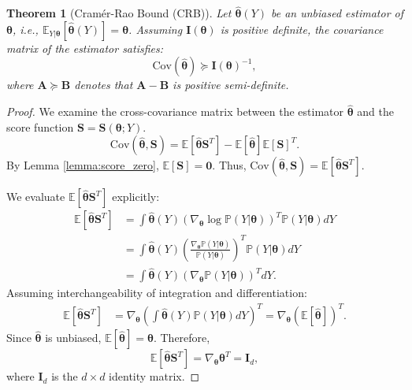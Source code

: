 \documentclass{article}
\newtheorem{theorem}{Theorem}[section]
\theoremstyle{definition}
\begin{document}
\begin{theorem}[Cramér-Rao Bound (CRB)]
\label{thm:crb}
Let $\hat{\boldsymbol{\theta}}(Y)$ be an unbiased estimator of $\boldsymbol{\theta}$, i.e., $\mathbb{E}_{Y|\boldsymbol{\theta}}[\hat{\boldsymbol{\theta}}(Y)] = \boldsymbol{\theta}$. Assuming $\mathbf{I}(\boldsymbol{\theta})$ is positive definite, the covariance matrix of the estimator satisfies:
\begin{equation}
    \text{Cov}(\hat{\boldsymbol{\theta}}) \succeq \mathbf{I}(\boldsymbol{\theta})^{-1},
\end{equation}
where $\mathbf{A} \succeq \mathbf{B}$ denotes that $\mathbf{A}-\mathbf{B}$ is positive semi-definite.
\end{theorem}
\begin{proof}
We examine the cross-covariance matrix between the estimator $\hat{\boldsymbol{\theta}}$ and the score function $\mathbf{S} = \mathbf{S}(\boldsymbol{\theta}; Y)$.
\begin{equation}
    \text{Cov}(\hat{\boldsymbol{\theta}}, \mathbf{S}) = \mathbb{E}[\hat{\boldsymbol{\theta}} \mathbf{S}^T] - \mathbb{E}[\hat{\boldsymbol{\theta}}] \mathbb{E}[\mathbf{S}]^T.
\end{equation}
By Lemma \ref{lemma:score_zero}, $\mathbb{E}[\mathbf{S}] = \mathbf{0}$. Thus, $\text{Cov}(\hat{\boldsymbol{\theta}}, \mathbf{S}) = \mathbb{E}[\hat{\boldsymbol{\theta}} \mathbf{S}^T]$.

We evaluate $\mathbb{E}[\hat{\boldsymbol{\theta}} \mathbf{S}^T]$ explicitly:
\begin{align}
    \mathbb{E}[\hat{\boldsymbol{\theta}} \mathbf{S}^T] &= \int \hat{\boldsymbol{\theta}}(Y) (\nabla_{\boldsymbol{\theta}} \log \mathbb{P}(Y|\boldsymbol{\theta}))^T \mathbb{P}(Y|\boldsymbol{\theta}) dY \\
    &= \int \hat{\boldsymbol{\theta}}(Y) \left(\frac{\nabla_{\boldsymbol{\theta}} \mathbb{P}(Y|\boldsymbol{\theta})}{\mathbb{P}(Y|\boldsymbol{\theta})}\right)^T \mathbb{P}(Y|\boldsymbol{\theta}) dY \\
    &= \int \hat{\boldsymbol{\theta}}(Y) (\nabla_{\boldsymbol{\theta}} \mathbb{P}(Y|\boldsymbol{\theta}))^T dY.
\end{align}
Assuming interchangeability of integration and differentiation:
\begin{align}
    \mathbb{E}[\hat{\boldsymbol{\theta}} \mathbf{S}^T] &= \nabla_{\boldsymbol{\theta}} \left(\int \hat{\boldsymbol{\theta}}(Y) \mathbb{P}(Y|\boldsymbol{\theta}) dY\right)^T = \nabla_{\boldsymbol{\theta}} (\mathbb{E}[\hat{\boldsymbol{\theta}}])^T.
\end{align}
Since $\hat{\boldsymbol{\theta}}$ is unbiased, $\mathbb{E}[\hat{\boldsymbol{\theta}}] = \boldsymbol{\theta}$. Therefore,
\begin{equation}
    \mathbb{E}[\hat{\boldsymbol{\theta}} \mathbf{S}^T] = \nabla_{\boldsymbol{\theta}} \boldsymbol{\theta}^T = \mathbf{I}_d,
\end{equation}
where $\mathbf{I}_d$ is the $d \times d$ identity matrix.


\end{proof}
\end{document}
